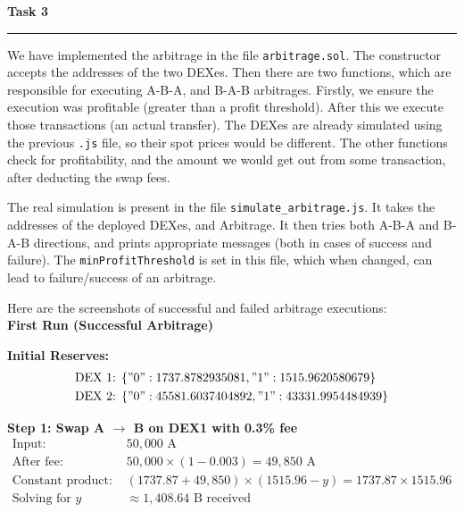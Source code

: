 \documentclass[a4paper]{article}
\newenvironment{solution}[2][]{%
\begin{mdframed}[linecolor=blue!70!black, linewidth=2pt, roundcorner=10pt, backgroundcolor=yellow!10!white, skipabove=12pt, skipbelow=12pt]%
	\textbf{\large #2}
	\par\noindent\rule{\textwidth}{0.4pt}
}{
\end{mdframed}
}
\begin{document}
\clearpage
\begin{solution}{Task 3}
	We have implemented the arbitrage in the file \texttt{arbitrage.sol}. The constructor accepts the addresses of the two DEXes. Then there are two functions, which are responsible for executing A-B-A, and B-A-B arbitrages. Firstly, we ensure the execution was profitable (greater than a profit threshold). After this we execute those transactions (an actual transfer). The DEXes are already simulated using the previous \texttt{.js} file, so their spot prices would be different. The other functions check for profitability, and the amount we would get out from some transaction, after deducting the swap fees.

	The real simulation is present in the file \texttt{simulate\_arbitrage.js}. It takes the addresses of the deployed DEXes, and Arbitrage. It then tries both A-B-A and B-A-B directions, and prints appropriate messages (both in cases of success and failure). The \texttt{minProfitThreshold} is set in this file, which when changed, can lead to failure/success of an arbitrage.

	Here are the screenshots of successful and failed arbitrage executions:\\
	\textbf{First Run (Successful Arbitrage)}

	\begin{figure}[H]
		\centering
	\end{figure}

	\textbf{Initial Reserves:}
	\begin{align*}
	\text{DEX 1: } &\{"0":1737.8782935081, "1":1515.9620580679\}\\
	\text{DEX 2: } &\{"0":45581.6037404892, "1":43331.9954484939\}
	\end{align*}
	
	\textbf{Step 1: Swap A $\rightarrow$ B on DEX1 with 0.3\% fee}
	\begin{align*}
	\text{Input: } &50,000 \text{ A}\\
	\text{After fee: } &50,000 \times (1 - 0.003) = 49,850 \text{ A}\\
	\text{Constant product: } &(1737.87 + 49,850) \times (1515.96 - y) = 1737.87 \times 1515.96\\
	\text{Solving for } y &\approx 1,408.64 \text{ B received}
	\end{align*}
	

\end{solution}
\end{document}
